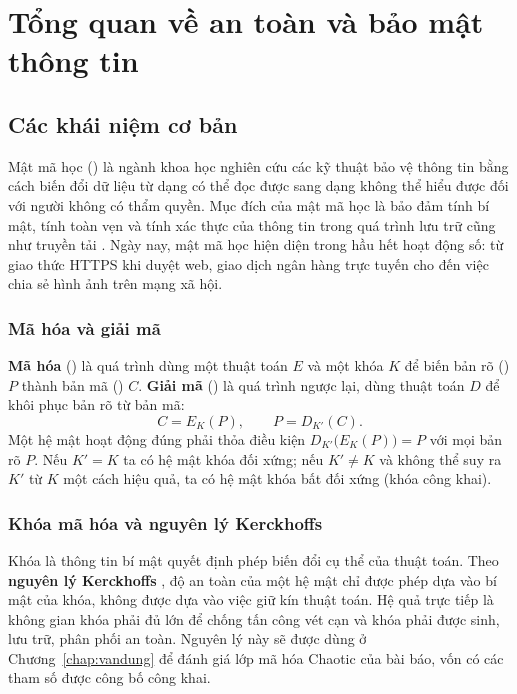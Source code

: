 \chapter{Tổng quan về an toàn và bảo mật thông tin}
\label{chap:tongquan}

\section{Các khái niệm cơ bản}

Mật mã học () là ngành khoa học nghiên cứu các kỹ thuật bảo vệ thông tin
bằng cách biến đổi dữ liệu từ dạng có thể đọc được sang dạng không thể hiểu được đối với
người không có thẩm quyền. Mục đích của mật mã học là bảo đảm tính bí mật, tính toàn vẹn
và tính xác thực của thông tin trong quá trình lưu trữ cũng như truyền tải
\cite{stallings2020, menezes1996}. Ngày nay, mật mã học hiện diện trong hầu hết hoạt động
số: từ giao thức HTTPS khi duyệt web, giao dịch ngân hàng trực tuyến cho đến việc chia sẻ
hình ảnh trên mạng xã hội.

\subsection{Mã hóa và giải mã}

\textbf{Mã hóa} () là quá trình dùng một thuật toán $E$ và một khóa $K$ để
biến bản rõ () $P$ thành bản mã () $C$. \textbf{Giải mã}
() là quá trình ngược lại, dùng thuật toán $D$ để khôi phục bản rõ từ bản mã:
\begin{equation}
  C = E_K(P), \qquad P = D_{K'}(C).
  \label{eq:enc-dec}
\end{equation}
Một hệ mật hoạt động đúng phải thỏa điều kiện $D_{K'}\bigl(E_K(P)\bigr) = P$ với mọi bản rõ
$P$. Nếu $K' = K$ ta có hệ mật khóa đối xứng; nếu $K' \neq K$ và không thể suy ra $K'$ từ
$K$ một cách hiệu quả, ta có hệ mật khóa bất đối xứng (khóa công khai).

\subsection{Khóa mã hóa và nguyên lý Kerckhoffs}

Khóa là thông tin bí mật quyết định phép biến đổi cụ thể của thuật toán. Theo
\textbf{nguyên lý Kerckhoffs} \cite{kerckhoffs1883}, độ an toàn của một hệ mật chỉ được phép
dựa vào bí mật của khóa, không được dựa vào việc giữ kín thuật toán. Hệ quả trực tiếp là
không gian khóa phải đủ lớn để chống tấn công vét cạn và khóa phải được sinh, lưu trữ, phân
phối an toàn. Nguyên lý này sẽ được dùng ở Chương~\ref{chap:vandung} để đánh giá lớp mã hóa
Chaotic của bài báo, vốn có các tham số được công bố công khai.

